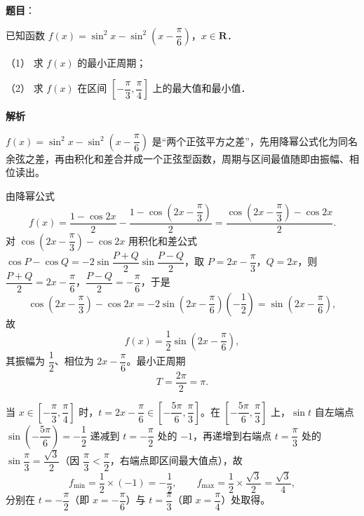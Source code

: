 \begin{answer}

\textbf{题目}：

已知函数 \(f(x)=\sin^2 x-\sin^2\left(x-\dfrac{\pi}{6}\right)\)，\(x\in\mathbf{R}\)．

（1） 求 \(f(x)\) 的最小正周期；

（2） 求 \(f(x)\) 在区间 \(\left[-\dfrac{\pi}{3},\dfrac{\pi}{4}\right]\) 上的最大值和最小值．

\textbf{解析}

\(f(x)=\sin^{2}x-\sin^{2}\left(x-\dfrac{\pi}{6}\right)\) 是“两个正弦平方之差”，先用降幂公式化为同名余弦之差，再由积化和差合并成一个正弦型函数，周期与区间最值随即由振幅、相位读出。


由降幂公式
\nopagebreak[4]
\[
f(x)=\dfrac{1-\cos 2x}{2}-\dfrac{1-\cos\left(2x-\dfrac{\pi}{3}\right)}{2}
=\dfrac{\cos\left(2x-\dfrac{\pi}{3}\right)-\cos 2x}{2}.
\]
对 \(\cos\left(2x-\dfrac{\pi}{3}\right)-\cos 2x\) 用积化和差公式 \(\cos P-\cos Q=-2\sin\dfrac{P+Q}{2}\sin\dfrac{P-Q}{2}\)，取 \(P=2x-\dfrac{\pi}{3}\)，\(Q=2x\)，则 \(\dfrac{P+Q}{2}=2x-\dfrac{\pi}{6}\)，\(\dfrac{P-Q}{2}=-\dfrac{\pi}{6}\)，于是
\nopagebreak[4]
\[
\cos\left(2x-\dfrac{\pi}{3}\right)-\cos 2x=-2\sin\left(2x-\dfrac{\pi}{6}\right)\left(-\dfrac{1}{2}\right)=\sin\left(2x-\dfrac{\pi}{6}\right),
\]
故
\nopagebreak[4]
\[
f(x)=\dfrac{1}{2}\sin\left(2x-\dfrac{\pi}{6}\right),
\]
其振幅为 \(\dfrac{1}{2}\)、相位为 \(2x-\dfrac{\pi}{6}\)。最小正周期
\nopagebreak[4]
\[
T=\dfrac{2\pi}{2}=\pi .
\]


当 \(x\in\left[-\dfrac{\pi}{3},\dfrac{\pi}{4}\right]\) 时，\(t=2x-\dfrac{\pi}{6}\in\left[-\dfrac{5\pi}{6},\dfrac{\pi}{3}\right]\)。在 \(\left[-\dfrac{5\pi}{6},\dfrac{\pi}{3}\right]\) 上，\(\sin t\) 自左端点 \(\sin\left(-\dfrac{5\pi}{6}\right)=-\dfrac{1}{2}\) 递减到 \(t=-\dfrac{\pi}{2}\) 处的 \(-1\)，再递增到右端点 \(t=\dfrac{\pi}{3}\) 处的 \(\sin\dfrac{\pi}{3}=\dfrac{\sqrt{3}}{2}\)（因 \(\dfrac{\pi}{3}<\dfrac{\pi}{2}\)，右端点即区间最大值点），故
\nopagebreak[4]
\[
f_{\min}=\dfrac{1}{2}\times(-1)=-\dfrac{1}{2},\qquad f_{\max}=\dfrac{1}{2}\times\dfrac{\sqrt{3}}{2}=\dfrac{\sqrt{3}}{4},
\]
分别在 \(t=-\dfrac{\pi}{2}\)（即 \(x=-\dfrac{\pi}{6}\)）与 \(t=\dfrac{\pi}{3}\)（即 \(x=\dfrac{\pi}{4}\)）处取得。


\end{answer}
